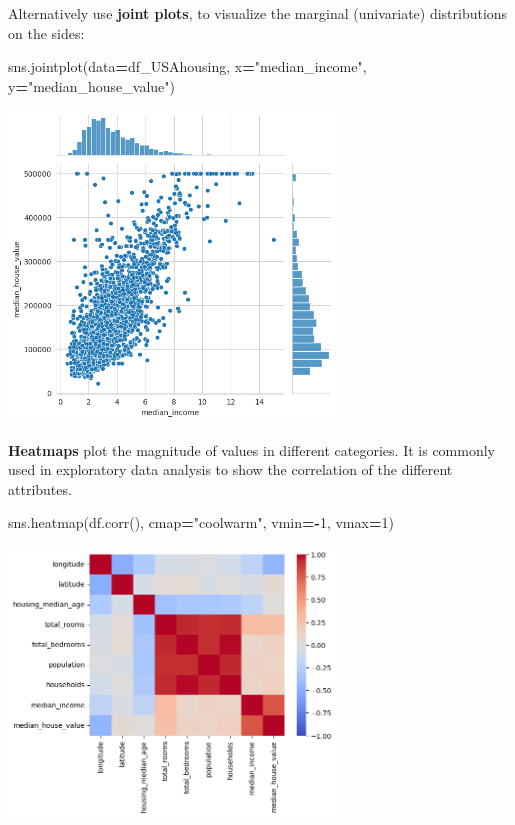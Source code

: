 \documentclass[
]{book}
\newenvironment{Shaded}{\begin{snugshade}}{\end{snugshade}}
\newcommand{\DecValTok}[1]{\textcolor[rgb]{0.00,0.00,0.81}{#1}}
\newcommand{\NormalTok}[1]{#1}
\newcommand{\OperatorTok}[1]{\textcolor[rgb]{0.81,0.36,0.00}{\textbf{#1}}}
\newcommand{\StringTok}[1]{\textcolor[rgb]{0.31,0.60,0.02}{#1}}
\begin{document}
Alternatively use \textbf{joint plots}, to visualize the marginal
(univariate) distributions on the sides:

\begin{Shaded}
\begin{Highlighting}[]
\NormalTok{sns.jointplot(data}\OperatorTok{=}\NormalTok{df\_USAhousing, x}\OperatorTok{=}\StringTok{"median\_income"}\NormalTok{, y}\OperatorTok{=}\StringTok{"median\_house\_value"}\NormalTok{)}
\end{Highlighting}
\end{Shaded}

\includegraphics[width=0.65\textwidth,height=\textheight]{figures/jointplot_housing.png}

\textbf{Heatmaps} plot the magnitude of values in different categories. It is
commonly used in exploratory data analysis to show the correlation of
the different attributes.

\begin{Shaded}
\begin{Highlighting}[]
\NormalTok{sns.heatmap(df.corr(), cmap}\OperatorTok{=}\StringTok{"coolwarm"}\NormalTok{, vmin}\OperatorTok{={-}}\DecValTok{1}\NormalTok{, vmax}\OperatorTok{=}\DecValTok{1}\NormalTok{)}
\end{Highlighting}
\end{Shaded}

\includegraphics[width=0.65\textwidth,height=\textheight]{figures/heatmap_usa_housing.png}
\end{document}

